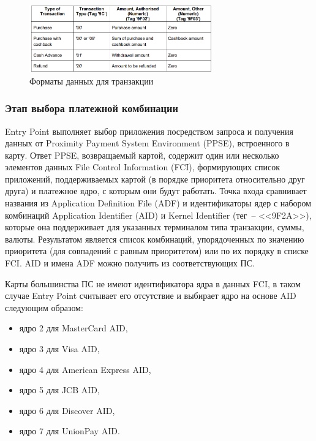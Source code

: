 \begin{figure}[H]
    \centering
    \includegraphics[width=0.7\textwidth]{images/research/transaction_types}
    \caption{\centering Форматы данных для транзакции}
    \label{fig:transaction_types}
\end{figure}


\subsubsection{Этап выбора платежной комбинации}
\label{subsubsec:protocol_activation}

Entry Point выполняет выбор приложения посредством запроса и получения данных от Proximity Payment System Environment (PPSE), встроенного в карту.
Ответ PPSE, возвращаемый картой, содержит один или несколько элементов данных File Control Information (FCI), формирующих список приложений, поддерживаемых картой (в порядке приоритета относительно друг друга) и платежное ядро, с которым они будут работать.
Точка входа сравнивает названия из Application Definition File (ADF) и идентификаторы ядер с набором комбинаций Application Identifier (AID) и Kernel Identifier (тег~-- <<9F2A>>), которые она поддерживает для указанных терминалом типа транзакции, суммы, валюты.
Результатом является список комбинаций, упорядоченных по значению приоритета (для совпадений с равным приоритетом) или по их порядку в списке FCI.
AID и имена ADF можно получить из соответствующих ПС.

Карты большинства ПС не имеют идентификатора ядра в данных FCI, в таком случае Entry Point считывает его отсутствие и выбирает ядро на основе AID следующим образом:
\begin{itemize}
    \item ядро 2 для MasterCard AID,
    \item ядро 3 для Visa AID,
    \item ядро 4 для American Express AID,
    \item ядро 5 для JCB AID,
    \item ядро 6 для Discover AID,
    \item ядро 7 для UnionPay AID.
\end{itemize}

